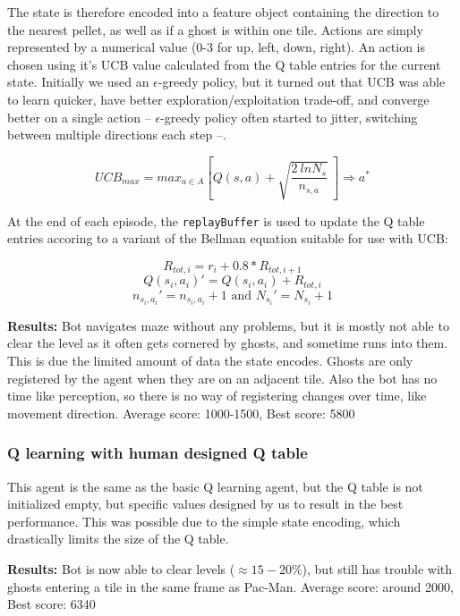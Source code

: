\documentclass[10pt, letterpaper]{article}
\begin{document}
                The state is therefore encoded into a feature object containing the direction to the nearest pellet, as well as if a ghost is within one tile. Actions are simply represented by a numerical value (0-3 for up, left, down, right). An action is chosen using it's UCB value calculated from the Q table entries for the current state. Initially we used an $\epsilon$-greedy policy, but it turned out that UCB was able to learn quicker, have better exploration/exploitation trade-off, and converge better on a single action -- $\epsilon$-greedy policy often started to jitter, switching between multiple directions each step --.
                
                $$UCB_{max} = max_{a \in A} \left[ Q(s,a) + \sqrt{\frac{2\ ln N_s}{n_{s,a}}}\ \right] \Rightarrow a^*$$
                
                At the end of each episode, the \texttt{replayBuffer} is used to update the Q table entries accoring to a variant of the Bellman equation suitable for use with UCB:
                
                $$R_{tot,i} = r_i + 0.8 * R_{tot,i+1}$$
                $$Q(s_i,a_i)' = Q(s_i,a_i) + R_{tot,i}$$
                $$n_{s_i,a_i}' = n_{s_i,a_i} + 1 \text{ and } N_{s_i}' = N_{s_i} + 1$$
                
                \vspace{1em}\noindent
                \textbf{Results:} Bot navigates maze without any problems, but it is mostly not able to clear the level as it often gets cornered by ghosts, and sometime runs into them. This is due the limited amount of data the state encodes. Ghosts are only registered by the agent when they are on an adjacent tile. Also the bot has no time like perception, so there is no way of registering changes over time, like movement direction. Average score: 1000-1500, Best score: 5800
                
            \subsubsection*{Q learning with human designed Q table}
                This agent is the same as the basic Q learning agent, but the Q table is not initialized empty, but specific values designed by us to result in the best performance. This was possible due to the simple state encoding, which drastically limits the size of the Q table.
                
                \vspace{1em}\noindent
                \textbf{Results:} Bot is now able to clear levels ($\approx 15-20\%$), but still has trouble with ghosts entering a tile in the same frame as Pac-Man. Average score: around 2000, Best score: 6340
                
\end{document}

